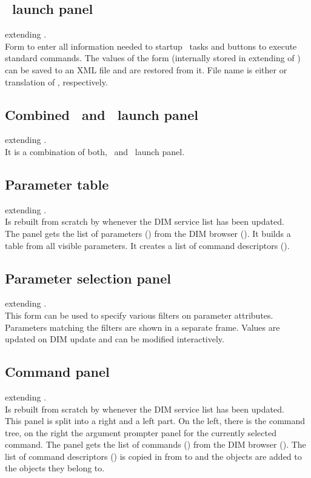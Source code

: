 \subsection{\mbs\ launch panel}
 extending .\\
Form to enter all information needed to startup \mbs\ tasks and
buttons to execute standard commands.
The values of the form (internally stored in  extending of )
can be saved to an XML file and are restored from it. File name is either
 or translation of , respectively.
\subsection{Combined \dabc\ and \mbs\ launch panel}
 extending .\\
It is a combination of both, \dabc\ and \mbs\ launch panel.
\subsection{Parameter table}
 extending .\\
Is rebuilt from scratch by  whenever the DIM service list has been updated.\\
The panel gets the list of parameters () from the DIM browser (). It builds a table from all visible parameters.
It creates a list of command descriptors ().
\subsection{Parameter selection panel}
 extending .\\
This form can be used to specify various filters on parameter attributes.
Parameters matching the filters are shown in a separate frame. Values
are updated on DIM update and can be modified interactively.
\subsection{Command panel}
 extending .\\
Is rebuilt from scratch by  whenever the DIM service list has been updated.\\
This panel is split into a right and a left part. On the left, there is the command tree,
on the right the argument prompter panel for the currently selected command.
The panel gets the list of commands () from the DIM browser ().
The list of command descriptors () is copied in  from  to
 and the  objects are added to the
 objects they belong to.

